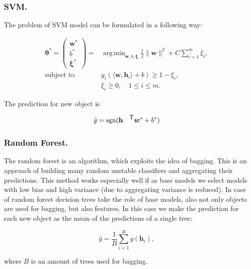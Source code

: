 \documentclass{llncs}
\DeclareMathOperator{\sgn}{\mathop{sgn}}
\DeclareMathOperator*{\argmin}{arg\,min}
\newcommand{\T}{{\mbox{\footnotesize\sffamily\upshape\mdseries T}}}
\begin{document}
\subsubsection{SVM.}
The problem of SVM model can be formulated in a following way:

\begin{align*}
\bm{\theta}^*  = \begin{pmatrix}
\bm{w^*} \\ b^* \\ \bm{\xi}^*
\end{pmatrix}= &\argmin_{\bm{w}, b, \bm{\xi}}  \frac{1}{2} \|\bm{w}\|^2 + C\sum_{i=1}^{m} \xi_i,\\
\mbox{subject to} \quad &y_i (\langle \bm{w}, \mathbf{h}_i \rangle + b) \geq 1 - \xi_i,\\
&\xi_i \geq 0, \quad 1 \leq i \leq m.
\end{align*}

The prediction for new object is

\begin{equation*}
\hat{y} = \sgn (\mathbf{h}^{\T} \bm{w}^* + b^*)
\end{equation*}

\subsubsection{Random Forest.}
The random forest is an algorithm, which exploits the idea of bagging. This is an approach of building many random unstable classifiers and aggregating their predictions. This method works especially well if as base models we select models with low bias and high variance (due to aggregating variance is reduced). In case of random forest decision trees take the role of base models, also not only objects are used for bagging, but also features. In this case we make the prediction for each new object as the mean of the predictions of a single tree:

\begin{equation*}
\hat{y} = \frac{1}{B} \sum_{i=1}^{B} g(\mathbf{h}_i),
\end{equation*}

where $B$ is an amount of trees used for bagging.
\end{document}
